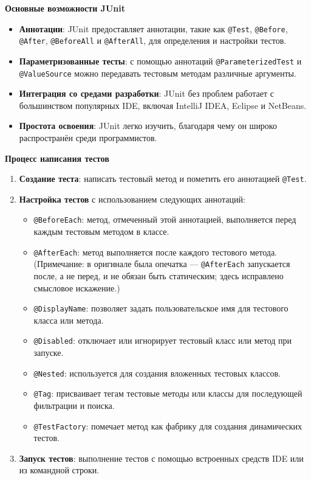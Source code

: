 \documentclass{article}[14pt]
\begin{document}
\noindent \textbf{Основные возможности JUnit}

\begin{itemize}
\item \textbf{Аннотации}: JUnit предоставляет аннотации, такие как \texttt{@Test}, \texttt{@Before}, \texttt{@After}, \texttt{@BeforeAll} и \texttt{@AfterAll}, для определения и настройки тестов.
\item \textbf{Параметризованные тесты}: с помощью аннотаций \texttt{@ParameterizedTest} и \texttt{@ValueSource} можно передавать тестовым методам различные аргументы.
\item \textbf{Интеграция со средами разработки}: JUnit без проблем работает с большинством популярных IDE, включая IntelliJ IDEA, Eclipse и NetBeans.
\item \textbf{Простота освоения}: JUnit легко изучить, благодаря чему он широко распространён среди программистов.
\end{itemize}

\noindent \textbf{Процесс написания тестов}

\begin{enumerate}
\item \textbf{Создание теста}: написать тестовый метод и пометить его аннотацией \texttt{@Test}.
\item \textbf{Настройка тестов} с использованием следующих аннотаций:
  \begin{itemize}
    \item \texttt{@BeforeEach}: метод, отмеченный этой аннотацией, выполняется перед каждым тестовым методом в классе.
    \item \texttt{@AfterEach}: метод выполняется после каждого тестового метода. (Примечание: в оригинале была опечатка — \texttt{@AfterEach} запускается после, а не перед, и не обязан быть статическим; здесь исправлено смысловое искажение.)
    \item \texttt{@DisplayName}: позволяет задать пользовательское имя для тестового класса или метода.
    \item \texttt{@Disabled}: отключает или игнорирует тестовый класс или метод при запуске.
    \item \texttt{@Nested}: используется для создания вложенных тестовых классов.
    \item \texttt{@Tag}: присваивает тегам тестовые методы или классы для последующей фильтрации и поиска.
    \item \texttt{@TestFactory}: помечает метод как фабрику для создания динамических тестов.
  \end{itemize}
\item \textbf{Запуск тестов}: выполнение тестов с помощью встроенных средств IDE или из командной строки.
\end{enumerate}
\end{document}
